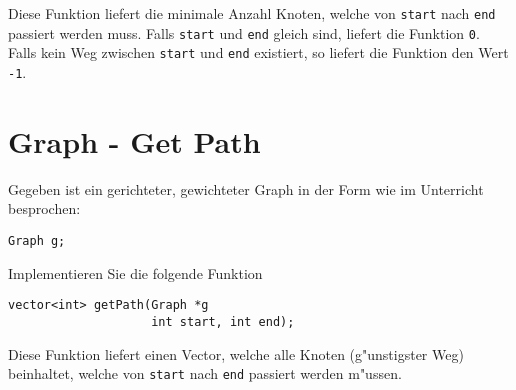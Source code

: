 \documentclass[a4paper,10pt]{article}
\begin{document}
Diese Funktion liefert die minimale Anzahl Knoten, welche von \verb|start| nach \verb|end|
passiert werden muss. Falls \verb|start| und \verb|end| gleich sind, liefert die Funktion
\verb|0|. Falls kein Weg zwischen \verb|start| und \verb|end| existiert, so liefert die
Funktion den Wert \verb|-1|.

\section{Graph - Get Path}
Gegeben ist ein gerichteter, gewichteter Graph in der Form wie im Unterricht besprochen:

\begin{lstlisting}
Graph g;
\end{lstlisting}

Implementieren Sie die folgende Funktion

\begin{lstlisting}
vector<int> getPath(Graph *g
                    int start, int end);
\end{lstlisting}

Diese Funktion liefert einen Vector, welche alle Knoten (g"unstigster Weg) beinhaltet, welche von 
\verb|start| nach \verb|end| passiert werden m"ussen.
\end{document}
